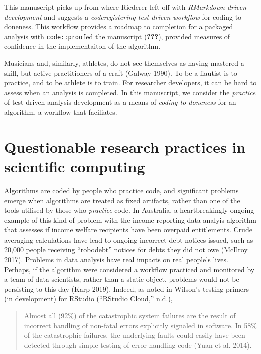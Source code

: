 \documentclass[
]{article}
\begin{document}
This manuscript picks up from where Riederer left off with
\emph{RMarkdown-driven development} and suggests a \emph{coderegistering
test-driven workflow} for coding to doneness. This workflow provides a
roadmap to completion for a packaged analysis with
\texttt{code::proof}ed the manuscript ({\textbf{???}}), provided
measures of confidence in the implementaiton of the algorithm.

Musicians and, similarly, athletes, do not see themselves as having
mastered a skill, but active practitioners of a craft (Galway 1990). To
be a flautist is to practice, and to be athlete is to train. For
researcher developers, it can be hard to assess when an analysis is
completed. In this manuscript, we consider the \emph{practice} of
test-driven analysis development as a means of \emph{coding to doneness}
for an algorithm, a workflow that faciliates.

\hypertarget{questionable-research-practices-in-scientific-computing}{%
\section{Questionable research practices in scientific
computing}\label{questionable-research-practices-in-scientific-computing}}

Algorithms are coded by people who practice code, and significant
problems emerge when algorithms are treated as fixed artifacts, rather
than one of the tools utilised by those who \emph{practice} code. In
Australia, a heartbreakingly-ongoing example of this kind of problem
with the income-reporting data analyis algorithm that assesses if income
welfare recipients have been overpaid entitlements. Crude averaging
calculations have lead to ongoing incorrect debt notices issued, such as
20,000 people receiving ``robodebt'' notices for debts they did not owe
(McIlroy 2017). Problems in data analysis have real impacts on real
people's lives. Perhaps, if the algorithm were considered a workflow
practiced and monitored by a team of data scientists, rather than a
static object, problems would not be persisting to this day (Karp 2019).
Indeed, as noted in Wilson's testing primers (in development) for
\href{https://rstudio.cloud/learn/primers}{RStudio} (``RStudio Cloud,''
n.d.),

\begin{quote}
Almost all (92\%) of the catastrophic system failures are the result of
incorrect handling of non-fatal errors explicitly signaled in software.
In 58\% of the catastrophic failures, the underlying faults could easily
have been detected through simple testing of error handling code (Yuan
et al. 2014).
\end{quote}
\end{document}
